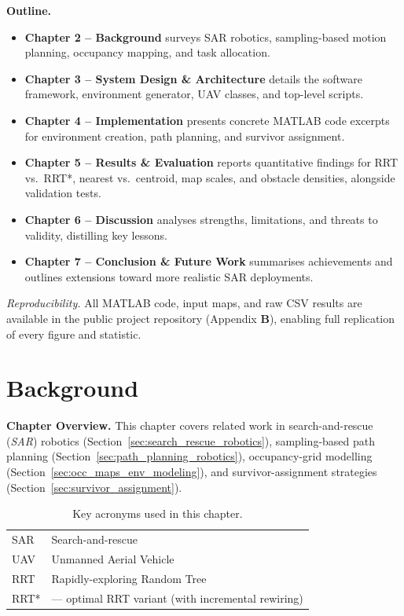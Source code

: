 \documentclass[12pt,a4paper]{report}
\begin{document}
\vspace{0.6em}
\noindent\textbf{Outline.}
\begin{itemize}[leftmargin=1.6em]
  \item \textbf{Chapter 2 – Background} surveys SAR robotics, sampling-based
        motion planning, occupancy mapping, and task allocation.
  \item \textbf{Chapter 3 – System Design \& Architecture} details the software
        framework, environment generator, UAV classes, and top-level scripts.
  \item \textbf{Chapter 4 – Implementation} presents concrete MATLAB code
        excerpts for environment creation, path planning, and survivor
        assignment.
  \item \textbf{Chapter 5 – Results \& Evaluation} reports quantitative
        findings for RRT vs.\ RRT*, nearest vs.\ centroid, map scales, and
        obstacle densities, alongside validation tests.
  \item \textbf{Chapter 6 – Discussion} analyses strengths, limitations, and
        threats to validity, distilling key lessons.
  \item \textbf{Chapter 7 – Conclusion \& Future Work} summarises achievements
        and outlines extensions toward more realistic SAR deployments.
\end{itemize}

\smallskip
\noindent\emph{Reproducibility.} All MATLAB code, input maps, and raw CSV results
are available in the public project repository
(Appendix \textbf{B}), enabling full replication of every figure and statistic.
\chapter{Background}
\label{cha:background}

\textbf{Chapter Overview.} 
This chapter covers related work in search-and-rescue (\emph{SAR}) robotics
(Section~\ref{sec:search_rescue_robotics}), sampling-based path planning
(Section~\ref{sec:path_planning_robotics}), occupancy-grid modelling
(Section~\ref{sec:occ_maps_env_modeling}), and survivor-assignment strategies
(Section~\ref{sec:survivor_assignment}).

\begin{table}[h]
\centering
\caption{Key acronyms used in this chapter.}  %
\label{tab:acronymsChapter2}
\begin{tabular}{@{}ll@{}}
\toprule
SAR  & Search-and-rescue \\
UAV  & Unmanned Aerial Vehicle \\
RRT  & Rapidly-exploring Random Tree \\
RRT* & — optimal RRT variant (with incremental rewiring) \\ %
\bottomrule
\end{tabular}
\end{table}
\end{document}
